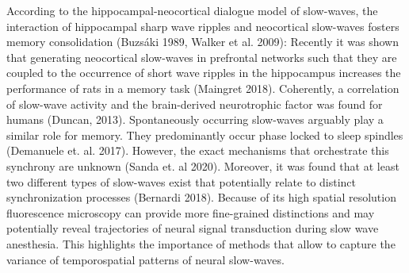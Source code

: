 According to the hippocampal-neocortical dialogue model of slow-waves, the interaction of hippocampal sharp wave ripples and neocortical slow-waves fosters memory consolidation (Buzsáki 1989, Walker et al. 2009): Recently it was shown that generating neocortical slow-waves in prefrontal networks such that they are coupled to the occurrence of short wave ripples in the hippocampus increases the performance of rats in a memory task (Maingret 2018). Coherently, a correlation of slow-wave activity and the brain-derived neurotrophic factor was found for humans (Duncan, 2013). Spontaneously occurring slow-waves arguably play a similar role for memory. They predominantly occur phase locked to sleep spindles (Demanuele et. al. 2017). However, the exact mechanisms that orchestrate this synchrony are unknown (Sanda et. al 2020). Moreover, it was found that at least two different types of slow-waves exist that potentially relate to distinct synchronization processes (Bernardi 2018). Because of its high spatial resolution fluorescence microscopy can provide more fine-grained distinctions and may potentially reveal trajectories of neural signal transduction during slow wave anesthesia. This highlights the importance of methods that allow to capture the variance of temporospatial patterns of neural slow-waves.


